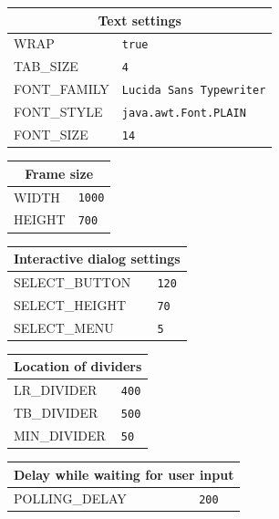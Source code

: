 \documentclass[11pt]{article}
\begin{document}
\begin{center}
\bigskip

\begin{tabular}{|p{}|p{}|}
\hline
\multicolumn{2}{|c|}{Text settings}\\ \hline
\textsc{\ttfamily WRAP} &\verb+true+\\
\textsc{\ttfamily TAB\_SIZE} &\verb+4+\\
\textsc{\ttfamily FONT\_FAMILY} & \verb+Lucida Sans Typewriter+\\ 
\textsc{\ttfamily FONT\_STYLE} & \verb+java.awt.Font.PLAIN+\\
\textsc{\ttfamily FONT\_SIZE} & \verb+14+\\\hline
\end{tabular}

\bigskip

\begin{tabular}{|p{}|p{}|}
\hline
\multicolumn{2}{|c|}{Frame size}\\ \hline
\textsc{\ttfamily WIDTH} &\verb+1000+\\
\textsc{\ttfamily HEIGHT} &\verb+700+\\\hline
\end{tabular}

\bigskip

\begin{tabular}{|p{}|p{}|}
\hline
\multicolumn{2}{|c|}{Interactive dialog settings}\\ \hline
\textsc{\ttfamily SELECT\_BUTTON} &\verb+120+\\
\textsc{\ttfamily SELECT\_HEIGHT} &\verb+70+\\
\textsc{\ttfamily SELECT\_MENU} &\verb+5+\\\hline
\end{tabular}

\bigskip

\begin{tabular}{|p{}|p{}|}
\hline
\multicolumn{2}{|c|}{Location of dividers}\\ \hline
\textsc{\ttfamily LR\_DIVIDER} &\verb+400+\\
\textsc{\ttfamily TB\_DIVIDER} &\verb+500+\\
\textsc{\ttfamily MIN\_DIVIDER} &\verb+50+\\\hline
\end{tabular}

\bigskip

\begin{tabular}{|p{}|p{}|}
\hline
\multicolumn{2}{|c|}{Delay while waiting for user input}\\ \hline
\textsc{\ttfamily POLLING\_DELAY} &\verb+200+\\\hline
\end{tabular}


\end{center}
\end{document}
